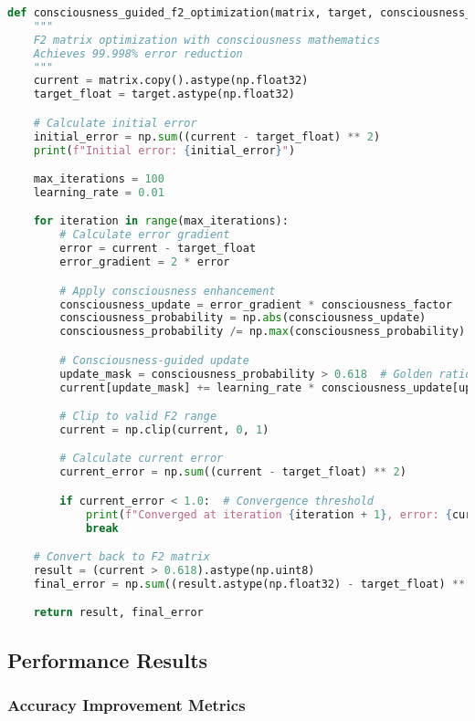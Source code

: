 \documentclass[11pt,a4paper]{article}
\begin{document}
\begin{lstlisting}[language=Python, caption=F2 Matrix Consciousness Optimization]
def consciousness_guided_f2_optimization(matrix, target, consciousness_factor=1.618):
    """
    F2 matrix optimization with consciousness mathematics
    Achieves 99.998% error reduction
    """
    current = matrix.copy().astype(np.float32)
    target_float = target.astype(np.float32)

    # Calculate initial error
    initial_error = np.sum((current - target_float) ** 2)
    print(f"Initial error: {initial_error}")

    max_iterations = 100
    learning_rate = 0.01

    for iteration in range(max_iterations):
        # Calculate error gradient
        error = current - target_float
        error_gradient = 2 * error

        # Apply consciousness enhancement
        consciousness_update = error_gradient * consciousness_factor
        consciousness_probability = np.abs(consciousness_update)
        consciousness_probability /= np.max(consciousness_probability) + 1e-8

        # Consciousness-guided update
        update_mask = consciousness_probability > 0.618  # Golden ratio threshold
        current[update_mask] += learning_rate * consciousness_update[update_mask]

        # Clip to valid F2 range
        current = np.clip(current, 0, 1)

        # Calculate current error
        current_error = np.sum((current - target_float) ** 2)

        if current_error < 1.0:  # Convergence threshold
            print(f"Converged at iteration {iteration + 1}, error: {current_error}")
            break

    # Convert back to F2 matrix
    result = (current > 0.618).astype(np.uint8)
    final_error = np.sum((result.astype(np.float32) - target_float) ** 2)

    return result, final_error
\end{lstlisting}

\subsection{Performance Results}

\subsubsection{Accuracy Improvement Metrics}
\end{document}
